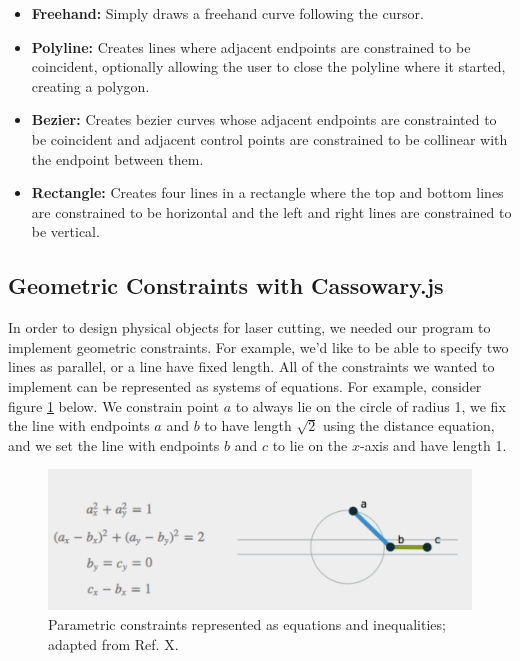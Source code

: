 \begin{itemize}
\item {\bf Freehand:} Simply draws a freehand curve following the cursor.
\item {\bf Polyline:} Creates lines where adjacent endpoints are constrained to be coincident, optionally allowing the user to close the polyline where it started, creating a polygon.
\item {\bf Bezier:} Creates bezier curves whose adjacent endpoints are constrainted to be coincident and adjacent control points are constrained to be collinear with the endpoint between them.
\item {\bf Rectangle:} Creates four lines in a rectangle where the top and bottom lines are constrained to be horizontal and the left and right lines are constrained to be vertical.
\end{itemize}

\subsection*{Geometric Constraints with Cassowary.js}

In order to design physical objects for laser cutting, we needed our program to implement geometric constraints. For example, we'd like to be able to specify two lines as parallel, or a line have fixed length. All of the constraints we wanted to implement can be represented as systems of equations. For example, consider figure \ref{fig:constraints} below. We constrain point $a$ to always lie on the circle of radius 1, we fix the line with endpoints $a$ and $b$ to have length $\sqrt{2}$ using the distance equation, and we set the line with endpoints $b$ and $c$ to lie on the $x$-axis and have length 1.

\begin{figure}[H]
  \includegraphics[width=\linewidth]{constraints.jpg}
  \caption{Parametric constraints represented as equations and inequalities; adapted from Ref. X. }
  \label{fig:constraints}
\end{figure}

